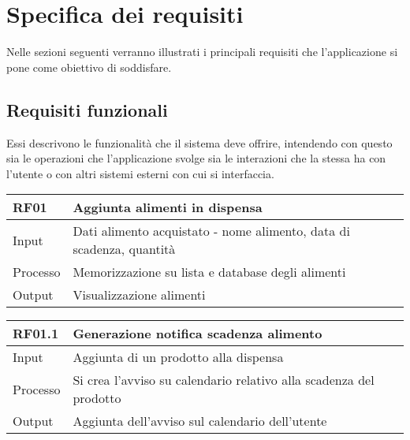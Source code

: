 
\chapter{Specifica dei requisiti}

Nelle sezioni seguenti verranno illustrati i principali requisiti che l'applicazione si pone come obiettivo di soddisfare.

\section{Requisiti funzionali}

Essi descrivono le funzionalità che il sistema deve offrire, intendendo con questo sia le operazioni che l'applicazione svolge sia le interazioni che la stessa ha con l'utente o con altri sistemi esterni con cui si interfaccia.

\begin{table}[H]
    \begin{flushleft}
      \begin{tabular}{l|l}
        \toprule
        \textbf{RF01} & \textbf{Aggiunta alimenti in dispensa}\\
        \midrule
        Input & Dati alimento acquistato - nome alimento, data di scadenza, quantità\\
        Processo & Memorizzazione su lista e database degli alimenti\\
        Output & Visualizzazione alimenti\\
        \bottomrule
      \end{tabular}
    \end{flushleft}
\end{table}

\begin{table}[H]
    \begin{flushleft}
      \begin{tabular}{l|l}
        \toprule
        \textbf{RF01.1} & \textbf{Generazione notifica scadenza alimento}\\
        \midrule
        Input & Aggiunta di un prodotto alla dispensa\\
        Processo & Si crea l’avviso su calendario relativo alla scadenza del prodotto\\
        Output & Aggiunta dell’avviso sul calendario dell’utente\\
        \bottomrule
      \end{tabular}
    \end{flushleft}
\end{table}

